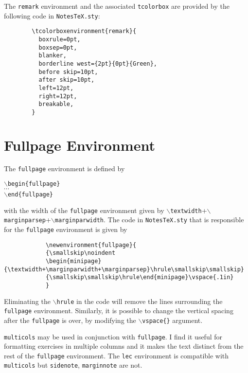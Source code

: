 \documentclass[10pt]{article}
\begin{document}
	\begin{remark}
		The \texttt{remark} environment and the associated \texttt{tcolorbox} are provided by the following code in \texttt{NotesTeX.sty}:
		\begin{verbatim}
		\tcolorboxenvironment{remark}{
		  boxrule=0pt,
		  boxsep=0pt,
		  blanker,
		  borderline west={2pt}{0pt}{Green},
		  before skip=10pt,
		  after skip=10pt,
		  left=12pt,
		  right=12pt,
		  breakable,
		}
		\end{verbatim}
	\end{remark}

	\section{Fullpage Environment}\label{Sec: Fullpage}
	\begin{fullpage}
		The \texttt{fullpage} environment is defined by
		\begin{center}
			\texttt{$\backslash$begin\{fullpage\}}\\
			$\cdots$\\
			\texttt{$\backslash$end\{fullpage\}}
		\end{center}
		with the width of the \texttt{fullpage} environment given by \texttt{$\backslash$textwidth}+\texttt{$\backslash$marginparsep}+\texttt{$\backslash$marginparwidth}. The code in \texttt{NotesTeX.sty} that is responsible for the \texttt{fullpage} environment is given by
		\begin{verbatim}
			\newenvironment{fullpage}{
			{\smallskip\noindent
			\begin{minipage}{\textwidth+\marginparwidth+\marginparsep}\hrule\smallskip\smallskip}
			{\smallskip\smallskip\hrule\end{minipage}\vspace{.1in}
			}
			\end{verbatim}
	\end{fullpage}
	\begin{remark}
		Eliminating the \texttt{$\backslash$hrule} in the code will remove the lines surrounding the \texttt{fullpage} environment. Similarly, it is possible to change the vertical spacing after the \texttt{fullpage} is over, by modifying the \texttt{$\backslash$vspace\{\}} argument. 
	\end{remark}
	
	\begin{fullpage}
		\begin{multicols}{2}
		\texttt{multicols}  may be used in conjunction with \texttt{fullpage}. I find it useful for formatting exercises in multiple columns and it makes the text distinct from the rest of the \texttt{fullpage} environment. The \texttt{lec} environment is compatible with \texttt{multicols} but \texttt{sidenote}, \texttt{marginnote} are not.\\

		\end{multicols}
	\end{fullpage}
\end{document}
